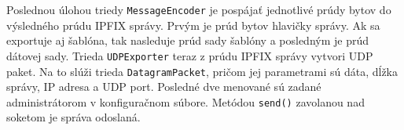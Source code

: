 Poslednou úlohou triedy \verb|MessageEncoder| je pospájať jednotlivé prúdy bytov do výsledného prúdu IPFIX 
správy. Prvým je prúd bytov hlavičky správy. Ak sa exportuje aj šablóna, tak nasleduje prúd sady šablóny 
a posledným je prúd dátovej sady. Trieda \verb|UDPExporter| teraz z prúdu IPFIX správy vytvori 
UDP paket. Na to slúži trieda \verb|DatagramPacket|, pričom jej parametrami sú dáta, dĺžka správy, 
IP adresa a UDP port. Posledné dve menované sú zadané administrátorom v konfiguračnom súbore. Metódou 
\verb|send()| zavolanou nad soketom je správa odoslaná.






